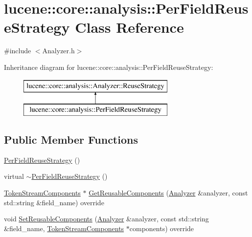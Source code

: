 \hypertarget{classlucene_1_1core_1_1analysis_1_1PerFieldReuseStrategy}{}\section{lucene\+:\+:core\+:\+:analysis\+:\+:Per\+Field\+Reuse\+Strategy Class Reference}
\label{classlucene_1_1core_1_1analysis_1_1PerFieldReuseStrategy}


{\ttfamily \#include $<$Analyzer.\+h$>$}

Inheritance diagram for lucene\+:\+:core\+:\+:analysis\+:\+:Per\+Field\+Reuse\+Strategy\+:\begin{figure}[H]
\begin{center}
\leavevmode
\includegraphics[height=2.000000cm]{classlucene_1_1core_1_1analysis_1_1PerFieldReuseStrategy}
\end{center}
\end{figure}
\subsection*{Public Member Functions}
\begin{DoxyCompactItemize}
\item 
\mbox{\hyperlink{classlucene_1_1core_1_1analysis_1_1PerFieldReuseStrategy_ab2081194878f10803b28ff228db7327c}{Per\+Field\+Reuse\+Strategy}} ()
\item 
virtual \mbox{\hyperlink{classlucene_1_1core_1_1analysis_1_1PerFieldReuseStrategy_ab5af1cea75460e48364696c8a89bdbeb}{$\sim$\+Per\+Field\+Reuse\+Strategy}} ()
\item 
\mbox{\hyperlink{classlucene_1_1core_1_1analysis_1_1TokenStreamComponents}{Token\+Stream\+Components}} $\ast$ \mbox{\hyperlink{classlucene_1_1core_1_1analysis_1_1PerFieldReuseStrategy_ab0d86155823842bb28e43bbbec7c06d3}{Get\+Reusable\+Components}} (\mbox{\hyperlink{classlucene_1_1core_1_1analysis_1_1Analyzer}{Analyzer}} \&analyzer, const std\+::string \&field\+\_\+name) override
\item 
void \mbox{\hyperlink{classlucene_1_1core_1_1analysis_1_1PerFieldReuseStrategy_ab23b95640469c639fd36ac888eeda1c3}{Set\+Reusable\+Components}} (\mbox{\hyperlink{classlucene_1_1core_1_1analysis_1_1Analyzer}{Analyzer}} \&analyzer, const std\+::string \&field\+\_\+name, \mbox{\hyperlink{classlucene_1_1core_1_1analysis_1_1TokenStreamComponents}{Token\+Stream\+Components}} $\ast$components) override
\end{DoxyCompactItemize}
